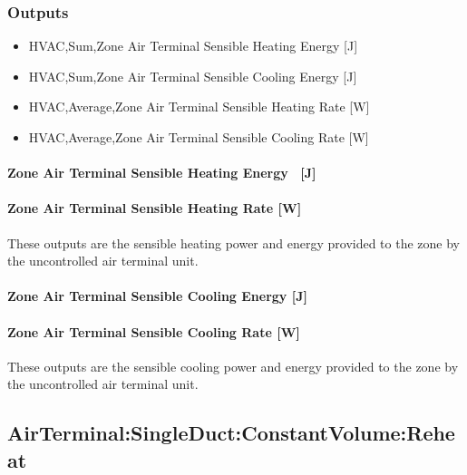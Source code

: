 \subsubsection{Outputs}\label{outputs-000}

\begin{itemize}
\item
  HVAC,Sum,Zone Air Terminal Sensible Heating Energy {[}J{]}
\item
  HVAC,Sum,Zone Air Terminal Sensible Cooling Energy {[}J{]}
\item
  HVAC,Average,Zone Air Terminal Sensible Heating Rate {[}W{]}
\item
  HVAC,Average,Zone Air Terminal Sensible Cooling Rate {[}W{]}
\end{itemize}

\paragraph{Zone Air Terminal Sensible Heating Energy~ {[}J{]}}\label{zone-air-terminal-sensible-heating-energy-j}

\paragraph{Zone Air Terminal Sensible Heating Rate {[}W{]}}\label{zone-air-terminal-sensible-heating-rate-w}

These outputs are the sensible heating power and energy provided to the zone by the uncontrolled air terminal unit.

\paragraph{Zone Air Terminal Sensible Cooling Energy {[}J{]}}\label{zone-air-terminal-sensible-cooling-energy-j}

\paragraph{Zone Air Terminal Sensible Cooling Rate {[}W{]}}\label{zone-air-terminal-sensible-cooling-rate-w}

These outputs are the sensible cooling power and energy provided to the zone by the uncontrolled air terminal unit.

\subsection{AirTerminal:SingleDuct:ConstantVolume:Reheat}\label{airterminalsingleductconstantvolumereheat}

